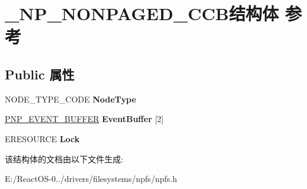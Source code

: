 \hypertarget{struct___n_p___n_o_n_p_a_g_e_d___c_c_b}{}\section{\+\_\+\+N\+P\+\_\+\+N\+O\+N\+P\+A\+G\+E\+D\+\_\+\+C\+C\+B结构体 参考}
\label{struct___n_p___n_o_n_p_a_g_e_d___c_c_b}
\subsection*{Public 属性}
\begin{DoxyCompactItemize}
\item 
\mbox{\label{struct___n_p___n_o_n_p_a_g_e_d___c_c_b_a7406f58a53f8a87ba5c725e8cac67196}} 
N\+O\+D\+E\+\_\+\+T\+Y\+P\+E\+\_\+\+C\+O\+DE {\bfseries Node\+Type}
\item 
\mbox{\label{struct___n_p___n_o_n_p_a_g_e_d___c_c_b_a7c7a2c409dcf8aed8e4a9939a626e39c}} 
\hyperlink{struct___n_p___e_v_e_n_t___b_u_f_f_e_r}{P\+N\+P\+\_\+\+E\+V\+E\+N\+T\+\_\+\+B\+U\+F\+F\+ER} {\bfseries Event\+Buffer} \mbox{[}2\mbox{]}
\item 
\mbox{\label{struct___n_p___n_o_n_p_a_g_e_d___c_c_b_a28fb7f670c6fa02f33054c243e13c05c}} 
E\+R\+E\+S\+O\+U\+R\+CE {\bfseries Lock}
\end{DoxyCompactItemize}


该结构体的文档由以下文件生成\+:\begin{DoxyCompactItemize}
\item 
E\+:/\+React\+O\+S-\/0../drivers/filesystems/npfs/npfs.\+h\end{DoxyCompactItemize}

